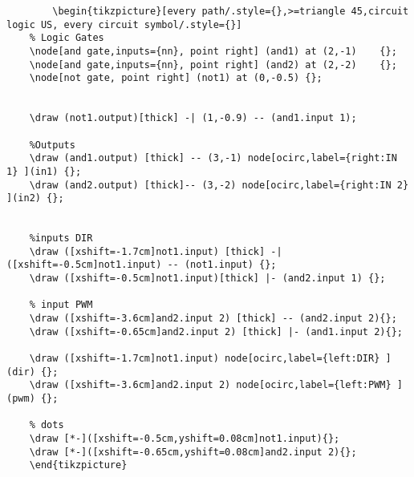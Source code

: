 \begin{verbatim}
		\begin{tikzpicture}[every path/.style={},>=triangle 45,circuit logic US, every circuit symbol/.style={}]
	% Logic Gates
	\node[and gate,inputs={nn}, point right] (and1) at (2,-1)    {};
	\node[and gate,inputs={nn}, point right] (and2) at (2,-2)    {};
	\node[not gate, point right] (not1) at (0,-0.5) {};
	
	
	\draw (not1.output)[thick] -| (1,-0.9) -- (and1.input 1);
	
	%Outputs
	\draw (and1.output) [thick] -- (3,-1) node[ocirc,label={right:IN 1} ](in1) {};
	\draw (and2.output) [thick]-- (3,-2) node[ocirc,label={right:IN 2} ](in2) {};
	
	
	%inputs DIR
	\draw ([xshift=-1.7cm]not1.input) [thick] -| ([xshift=-0.5cm]not1.input) -- (not1.input) {};
	\draw ([xshift=-0.5cm]not1.input)[thick] |- (and2.input 1) {};
	
	% input PWM
	\draw ([xshift=-3.6cm]and2.input 2) [thick] -- (and2.input 2){};
	\draw ([xshift=-0.65cm]and2.input 2) [thick] |- (and1.input 2){};
	
	\draw ([xshift=-1.7cm]not1.input) node[ocirc,label={left:DIR} ](dir) {};
	\draw ([xshift=-3.6cm]and2.input 2) node[ocirc,label={left:PWM} ](pwm) {};
	
	% dots
	\draw [*-]([xshift=-0.5cm,yshift=0.08cm]not1.input){};
	\draw [*-]([xshift=-0.65cm,yshift=0.08cm]and2.input 2){};
	\end{tikzpicture}
\end{verbatim}


